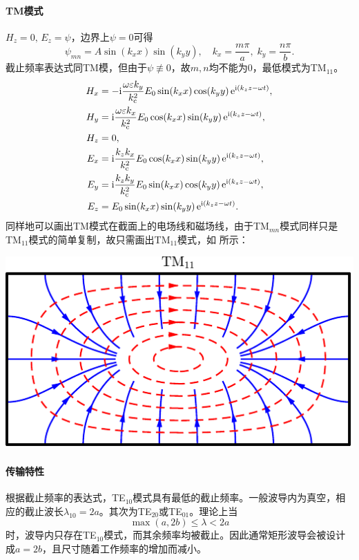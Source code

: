 \paragraph{TM模式}
$H_z=0,\,E_z=\psi$，边界上$\psi=0$可得
\begin{equation}
    \psi_{mn}=A\sin(k_xx)\sin(k_yy),\quad k_x=\frac{m\pi}a,\;k_y=\frac{n\pi}b.
\end{equation}
截止频率表达式同TM模，但由于$\psi\not\equiv 0$，故$m,n$均不能为0，最低模式为TM$_{11}$。
\begin{subequations}
    \begin{align}
        H_x&=-\mathrm{i}\frac{\omega\varepsilon k_y}{k_\text c^2}E_0\sin(k_xx)\cos(k_yy)\mathop{}\!\mathrm{e}^{\mathrm{i}(k_zz-\omega t)},\\
        H_y&=\mathrm{i}\frac{\omega\varepsilon k_x}{k_\text c^2}E_0\cos(k_xx)\sin(k_yy)\mathop{}\!\mathrm{e}^{\mathrm{i}(k_zz-\omega t)},\\
        H_z&=0,\\
        E_x&=\mathrm{i}\frac{k_zk_x}{k_\text c^2}E_0\cos(k_xx)\sin(k_yy)\mathop{}\!\mathrm{e}^{\mathrm{i}(k_zz-\omega t)},\\
        E_y&=\mathrm{i}\frac{k_zk_y}{k_\text c^2}E_0\sin(k_xx)\cos(k_yy)\mathop{}\!\mathrm{e}^{\mathrm{i}(k_zz-\omega t)},\\
        E_z&=E_0\sin(k_xx)\sin(k_yy)\mathop{}\!\mathrm{e}^{\mathrm{i}(k_zz-\omega t)}.
    \end{align}
\end{subequations}
同样地可以画出TM模式在截面上的电场线和磁场线，由于TM$_{mn}$模式同样只是TM$_{11}$模式的简单复制，故只需画出TM$_{11}$模式，如 所示：
\begin{center}
    \includegraphics[width=0.4\linewidth]{figures/waveguide_rect_TM.pdf}
    \label{fig:waveguide rect TM}
\end{center}

\paragraph{传输特性}

根据截止频率的表达式，TE$_{10}$模式具有最低的截止频率。一般波导内为真空，相应的截止波长$\lambda_{10}=2a$。其次为TE$_{20}$或TE$_{01}$。理论上当
\[
    \max(a,2b)\leq\lambda<2a
\]
时，波导内只存在TE$_{10}$模式，而其余频率均被截止。因此通常矩形波导会被设计成$a=2b$，且尺寸随着工作频率的增加而减小。

